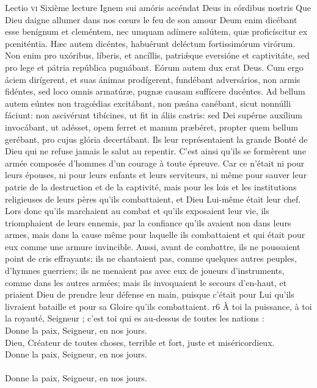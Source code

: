 \documentclass[twoside]{article}
\begin{document}
\begin{paracol}[1]{2}
\lectioresponsorium
	{Lectio \textsc{vi}}
	{Sixième lecture}
	{Ignem sui amóris accéndat Deus in córdibus nostris}
	{Que Dieu daigne allumer dans nos cœurs le feu de son amour}
	{
		Deum enim dicébant esse benígnum et cleméntem, nec umquam adímere salútem, quæ proficíscitur ex pœniténtia. Hæc autem dicéntes, habuérunt deléctum fortissimórum virórum. Non enim pro uxóribus, líberis, et ancíllis, patriǽque eversióne et captivitáte, sed pro lege et pátria república pugnábant. Eórum autem dux erat Deus. Cum ergo áciem dirígerent, et suas ánimas prodígerent, fundébant adversários, non armis fidéntes, sed loco omnis armatúræ, pugnæ causam suffícere ducéntes. Ad bellum autem eúntes non tragœ́dias excitábant, non pæána canébant, sicut nonnúlli fáciunt: non ascivérunt tibícines, ut fit in áliis castris: sed Dei supérne auxílium invocábant, ut adésset, opem ferret et manum præbéret, propter quem bellum gerébant, pro cujus glória decertábant.
	}
	{Ils leur représentaient la grande Bonté de Dieu qui ne refuse jamais le salut au repentir. C'est ainsi qu'ils se formèrent une armée composée d'hommes d'un courage à toute épreuve. Car ce n'était ni pour leurs épouses, ni pour leurs enfants et leurs serviteurs, ni même pour sauver leur patrie de la destruction et de la captivité, mais pour les lois et les institutions religieuses de leurs pères qu'ils combattaient, et Dieu Lui-même était leur chef. Lors donc qu'ils marchaient au combat et qu'ils exposaient leur vie, ils triomphaient de leurs ennemis, par la confiance qu'ils avaient non dans leurs armes, mais dans la cause même pour laquelle ils combattaient et qui était pour eux comme une armure invincible. Aussi, avant de combattre, ils ne poussaient point de cris effrayants; ils ne chantaient pas, comme quelques autres peuples, d'hymnes guerriers; ils ne menaient pas avec eux de joueurs d'instruments, comme dans les autres armées; mais ils invoquaient le secours d'en-haut, et priaient Dieu de prendre leur défense en main, puisque c'était pour Lui qu'ils livraient bataille et pour sa Gloire qu'ils combattaient.}
	{r6}
	{\rr À toi la puissance, à toi la royauté, Seigneur ; c’est toi qui es au-dessus de toutes les nations :\\
	\GreSpecial{*} Donne la paix, Seigneur, en nos jours.\\
	\vv Dieu, Créateur de toutes choses, terrible et fort, juste et miséricordieux.\\
	\GreSpecial{*} Donne la paix, Seigneur, en nos jours.\\
	\versetGloireAuPere{}\\
	\GreSpecial{*} Donne la paix, Seigneur, en nos jours.}


\end{paracol}
\end{document}
